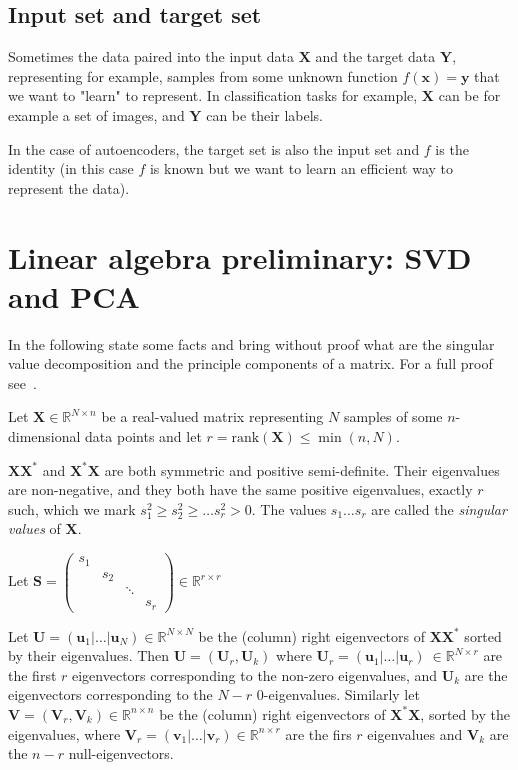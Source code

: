 \documentclass[11pt, a4paper]{report}
\theoremstyle{plain}
\theoremstyle{definition}
\theoremstyle{remark}
\newcommand{\R}{\mathbb{R}}
\newcommand{\X}{\mathbf{X}}
\newcommand{\x}{\mathbf{x}}
\newcommand{\Y}{\mathbf{Y}}
\newcommand{\y}{\mathbf{y}}
\newcommand{\bv}[1]{\boldsymbol{#1}}
\newcommand{\gt}{>}
\begin{document}
\subsection{Input set and target set}
Sometimes the data paired into the input data $\X$ and the
target data $\Y$, 
representing for example, samples from some unknown function $f(\x) = \y$
that we want to "learn" to represent.
In classification tasks for example, $\X$ can be for example a set of images,
and $\Y$ can be their labels.

In the case of autoencoders, the target set is also the input set and $f$ is the
identity (in this case $f$ is known but we want to learn an efficient way
to represent the data).


\section{Linear algebra preliminary: SVD and PCA}
In the following state some facts and bring without proof what are the singular
value decomposition and the principle components of a matrix. For a
full proof see~\cite{serre2001matrices}.

Let $\bv{X} \in \R^{N \times n}$ be a real-valued matrix
representing $N$ samples of some
$n$-dimensional data points and let
$r= \text{rank}(\bv{X}) \leq \min(n,N)$. 

$\X \X^*$ and $\X^* \X$ are both symmetric and positive semi-definite.
Their eigenvalues are non-negative, and they both have
the same positive 
eigenvalues, exactly $r$ such, which we mark
$s_1^2 \geq s_2^2 \geq \dots s_r^2 \gt 0$. The values
$s_1 \dots s_r$ are called the \emph{singular values} of $\bv{X}$.

Let $\bv{S} = 
\begin{pmatrix}
s_1 & & &\\
& s_2 & &\\
& & \ddots &\\
& & & s_r
\end{pmatrix} \in \R^{r \times r}
$

Let $\bv{U} = (\bv{u}_1 | \dots | \bv{u}_N) \in \R^{N \times N}$
be the (column) right eigenvectors of $\X \X^*$ sorted
by their eigenvalues. 
Then $\bv{U} = (\bv{U}_r, \bv{U}_k)$ 
where $\bv{U}_r = (\bv{u}_1 | \dots | \bv{u}_r) \ \in \R^{N \times r}$ are the first $r$
eigenvectors corresponding to the non-zero eigenvalues, and $\bv{U}_k$ are the
eigenvectors corresponding to the $N-r$ $0$-eigenvalues.
Similarly let 
$\bv{V}  = (\bv{V}_r, \bv{V}_k)\in \R^{n \times n}$
be the (column) right eigenvectors of $\X^* \X$, sorted
by the eigenvalues, 
where $\bv{V}_r  = (\bv{v}_1 | \dots | \bv{v}_r) \in \R^{n \times r}$ are the firs $r$
eigenvalues and $\bv{V}_k$ are the $n-r$ null-eigenvectors.
\end{document}
